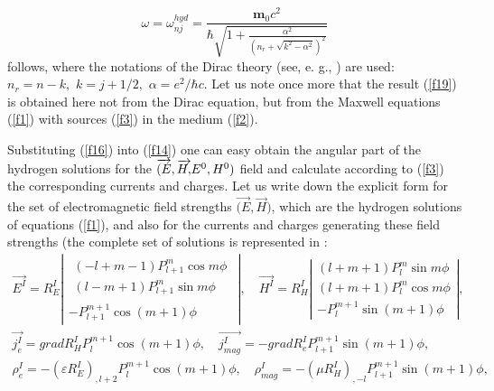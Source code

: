 \documentclass[a4paper,12pt]{article}
\begin{document}
\begin{equation}
\omega =\omega _{nj}^{hyd}=\frac{\mathbf{m}_0c^2}{\hbar \sqrt{1+\frac{\alpha
^2}{\left( n_r+\sqrt{k^2-\alpha ^2}\right) ^2}}}  \label{f19}
\end{equation}
follows, where the notations of the Dirac theory (see, e. g., \cite{BS}) are
used: $n_r=n-k,$ $k=j+1/2,$ $\alpha =e^2/\hbar c$. Let us note once more
that the result (\ref{f19}) is obtained here not from the Dirac equation,
but from the Maxwell equations (\ref{f1}) with sources (\ref{f3}) in the
medium (\ref{f2}).

Substituting (\ref{f16}) into (\ref{f14}) one can easy obtain the angular
part of the hydrogen solutions for the $\overrightarrow{(E},\overrightarrow{%
H,}E^0,H^0)$ field and calculate according to (\ref{f3}) the corresponding
currents and charges. Let us write down the explicit form for the set of
electromagnetic field strengths $\overrightarrow{(E},\overrightarrow{H})$,
which are the hydrogen solutions of equations (\ref{f1}), and also for the
currents and charges generating these field strengths (the complete set of
solutions is represented in \cite{S1}:
\begin{equation}
\begin{array}{c}
\overrightarrow{E^I}=R_E^I\left|
\begin{array}{c}
\begin{array}{c}
\left( -l+m-1\right) P_{l+1}^m\cos m\phi \\
\left( l-m+1\right) P_{l+1}^m\sin m\phi
\end{array}
\\
-P_{l+1}^{m+1}\cos \left( m+1\right) \phi
\end{array}
\right| ,\quad \overrightarrow{H^I}=R_H^I\left|
\begin{array}{c}
\left( l+m+1\right) P_l^m\sin m\phi \\
\left( l+m+1\right) P_l^m\cos m\phi \\
-P_l^{m+1}\sin \left( m+1\right) \phi
\end{array}
\right| , \\
\overrightarrow{j_e^I}=gradR_H^IP_l^{m+1}\cos \left( m+1\right) \phi ,\quad
\overrightarrow{j_{mag}^I}=-gradR_e^IP_{l+1}^{m+1}\sin \left( m+1\right)
\phi , \\
\rho _e^I=-\left( \varepsilon R_E^I\right) _{,l+2}P_l^{m+1}\cos \left(
m+1\right) \phi ,\quad \rho _{mag}^I=-\left( \mu R_H^I\right)
_{,-l}P_{l+1}^{m+1}\sin \left( m+1\right) \phi ,
\end{array}
\label{f20}
\end{equation}
\end{document}
